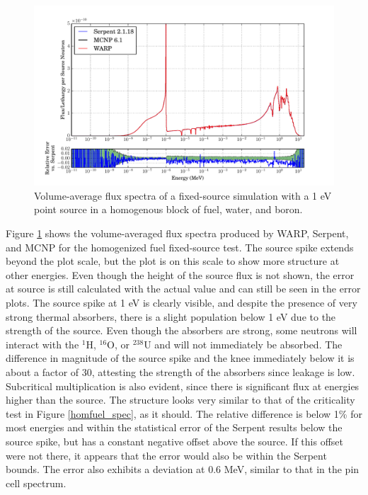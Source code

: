 \begin{figure}[h!]
\centering
\includegraphics[width=\textwidth,trim= 1cm 0cm 1cm 0cm]{graphics/finalresults/fixed_spec_homfuel.pdf}
\caption{Volume-average flux spectra of a fixed-source simulation with a 1 eV point source in a homogenous block of fuel, water, and boron. \label{fixed_spec_homfuel} }
\end{figure}

Figure \ref{fixed_spec_homfuel} shows the volume-averaged flux spectra produced by WARP, Serpent, and MCNP for the homogenized fuel fixed-source test.  The source spike extends beyond the plot scale, but the plot is on this scale to show more structure at other energies.  Even though the height of the source flux is not shown, the error at source is still calculated with the actual value and can still be seen in the error plots.  The source spike at 1 eV is clearly visible, and despite the presence of very strong thermal absorbers, there is a slight population below 1 eV due to the strength of the source.  Even though the absorbers are strong, some neutrons will interact with the $^{1}$H, $^{16}$O, or $^{238}$U and will not immediately be absorbed.  The difference in magnitude of the source spike and the knee immediately below it is about a factor of 30, attesting the strength of the absorbers since leakage is low.  Subcritical multiplication is also evident, since there is significant flux at energies higher than the source.  The structure looks very similar to that of the criticality test in Figure \ref{homfuel_spec}, as it should.  The relative difference is below 1\% for most energies and within the statistical error of the Serpent results below the source spike, but has a constant negative offset above the source.  If this offset were not there, it appears that the error would also be within the Serpent bounds.  The error also exhibits a deviation at 0.6 MeV, similar to that in the pin cell spectrum.   %

